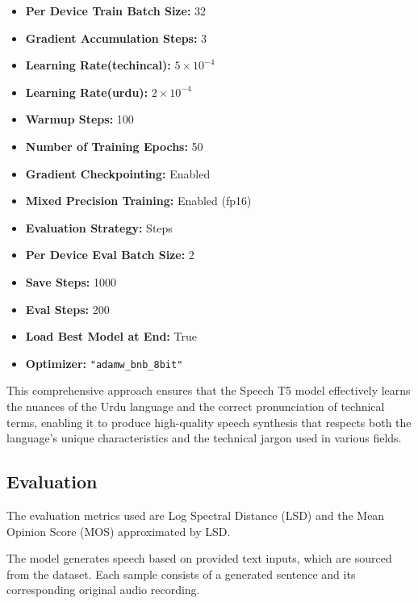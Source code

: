 \documentclass[conference]{IEEEtran}
\begin{document}
\begin{itemize}
    \item \textbf{Per Device Train Batch Size:} 32
    \item \textbf{Gradient Accumulation Steps:} 3
    \item \textbf{Learning Rate(techincal):} \(5 \times 10^{-4}\)
    \item \textbf{Learning Rate(urdu):} \(2 \times 10^{-4}\)
    \item \textbf{Warmup Steps:} 100
    \item \textbf{Number of Training Epochs:} 50
    \item \textbf{Gradient Checkpointing:} Enabled
    \item \textbf{Mixed Precision Training:} Enabled (fp16)
    \item \textbf{Evaluation Strategy:} Steps
    \item \textbf{Per Device Eval Batch Size:} 2
    \item \textbf{Save Steps:} 1000
    \item \textbf{Eval Steps:} 200
    \item \textbf{Load Best Model at End:} True
    \item \textbf{Optimizer:} \texttt{"adamw\_bnb\_8bit"}
\end{itemize}

This comprehensive approach ensures that the Speech T5 model effectively learns the nuances of the Urdu language and the correct pronunciation of technical terms, enabling it to produce high-quality speech synthesis that respects both the language's unique characteristics and the technical jargon used in various fields.


\subsection{Evaluation}
The evaluation metrics used are Log Spectral Distance (LSD) and the Mean Opinion Score (MOS) approximated by LSD.

The model generates speech based on provided text inputs, which are sourced from the dataset. Each sample consists of a generated sentence and its corresponding original audio recording.
\end{document}

